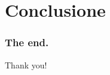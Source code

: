 \documentclass[12pt]{beamer}
\begin{document}
\section{Conclusione}


\begin{frame}
    \frametitle{The end.}
    \begin{center}

        \begin{Huge}        Thank you! \end{Huge}
\end{center}
    \end{frame}










\end{document}
